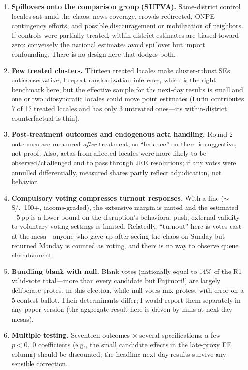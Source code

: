 \documentclass[11pt]{article}
\newcommand{\pp}{\,\text{pp}}
\begin{document}
\begin{enumerate}
\item \textbf{Spillovers onto the comparison group (SUTVA).} Same-district control locales sat amid the chaos: news coverage, crowds redirected, ONPE contingency efforts, and possible discouragement or mobilization of neighbors. If controls were partially treated, within-district estimates are biased toward zero; conversely the national estimates avoid spillover but import confounding. There is no design here that dodges both.
\item \textbf{Few treated clusters.} Thirteen treated locales make cluster-robust SEs anticonservative; I report randomization inference, which is the right benchmark here, but the effective sample for the next-day results is small and one or two idiosyncratic locales could move point estimates (Lurín contributes 7 of 13 treated locales and has only 3 untreated ones---its within-district counterfactual is thin).
\item \textbf{Post-treatment outcomes and endogenous acta handling.} Round-2 outcomes are measured \emph{after} treatment, so ``balance'' on them is suggestive, not proof. Also, actas from affected locales were more likely to be observed/challenged and to pass through JEE resolutions; if any votes were annulled differentially, measured shares partly reflect adjudication, not behavior.
\item \textbf{Compulsory voting compresses turnout responses.} With a fine ($\sim$S/.\ 100+, income-graded), the extensive margin is muted and the estimated $-$5$\pp$ is a lower bound on the disruption's behavioral push; external validity to voluntary-voting settings is limited. Relatedly, ``turnout'' here is votes cast at the mesa---anyone who gave up after seeing the chaos on Sunday but returned Monday is counted as voting, and there is no way to observe queue abandonment.
\item \textbf{Bundling blank with null.} Blank votes (nationally equal to 14\% of the R1 valid-vote total---more than every candidate but Fujimori!) are largely deliberate protest in this election, while null votes mix protest with error on a 5-contest ballot. Their determinants differ; I would report them separately in any paper version (the aggregate result here is driven by nulls at next-day mesas).
\item \textbf{Multiple testing.} Seventeen outcomes $\times$ several specifications: a few $p<0.10$ coefficients (e.g., the small candidate effects in the late-proxy FE column) should be discounted; the headline next-day results survive any sensible correction.
\end{enumerate}
\end{document}
